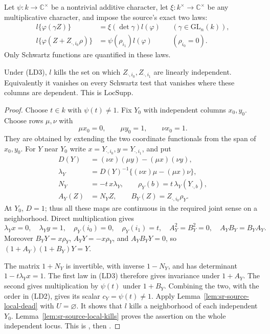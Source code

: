 Let \(\psi:k\to\mathbb C^\times\) be a nontrivial additive character,
let \(\xi:k^\times\to\mathbb C^\times\) be any multiplicative
character, and impose the source's exact two laws:
\[
 \begin{aligned}
 l\{\varphi(\gamma Z)\}&=\xi(\det\gamma)l(\varphi)
                      &&(\gamma\in\mathrm{GL}_n(k)),\\
 l\{\varphi(Z+Z_{\cdot,i_0}\rho)\}
       &=\psi(\rho_{i_1})l(\varphi)
                      &&(\rho_{i_0}=0).
 \end{aligned}\tag{LD3}\label{eq:sr-source-local-left-column}
\]
Only Schwartz functions are quantified in these laws.

\begin{srproposition}
\label{prop:sr-source-local-support}
Under (LD3), \(l\) kills the set on which
\(Z_{\cdot,i_0},Z_{\cdot,i_1}\) are linearly independent.
Equivalently it vanishes on every Schwartz test that vanishes
where these columns are dependent. This is \(\mathrm{LocSupp}\).
\end{srproposition}
\begin{proof}
Choose \(t\in k\) with \(\psi(t)\ne1\).
Fix \(Y_0\) with independent columns \(x_0,y_0\).
Choose rows \(\mu,\nu\) with
\[
 \mu x_0=0,\qquad \mu y_0=1,\qquad \nu x_0=1.
\]
They are obtained by extending the two coordinate functionals
from the span of \(x_0,y_0\).
For \(Y\) near \(Y_0\) write \(x=Y_{\cdot,i_0},y=Y_{\cdot,i_1}\), and put
\[
 \begin{split}
 D(Y)&=(\nu x)(\mu y)-(\mu x)(\nu y),\\
 \lambda_Y&=D(Y)^{-1}\{(\nu x)\mu-(\mu x)\nu\},\\
 N_Y&=-t\,x\lambda_Y,\qquad
 \rho_Y(b)=t\,\lambda_Y(Y_{\cdot,b}),\\
 A_Y(Z)&=N_YZ,\qquad B_Y(Z)=Z_{\cdot,i_0}\rho_Y .
 \end{split}\tag{LD4}\label{eq:sr-source-independent-stabilizers}
\]
At \(Y_0\), \(D=1\); thus all these maps are continuous in the
required joint sense on a neighborhood.
Direct multiplication gives
\[
 \lambda_Yx=0,\quad\lambda_Yy=1,\quad
 \rho_Y(i_0)=0,\quad\rho_Y(i_1)=t,\quad
 A_Y^2=B_Y^2=0,\quad A_YB_Y=B_YA_Y.
\]
Moreover \(B_YY=x\rho_Y\), \(A_YY=-x\rho_Y\), and
\(A_YB_YY=0\), so \((1+A_Y)(1+B_Y)Y=Y\).

The matrix \(1+N_Y\) is invertible, with inverse \(1-N_Y\),
and has determinant
\(1-t\lambda_Yx=1\).
The first law in (LD3) therefore gives invariance under \(1+A_Y\).
The second gives multiplication by \(\psi(t)\) under \(1+B_Y\).
Combining the two, with the order in (LD2), gives its scalar
\(c_Y=\psi(t)\ne1\).
Apply Lemma~\ref{lem:sr-source-local-dead} with \(U=\varnothing\).
It shows that \(l\) kills a neighborhood of each independent \(Y_0\).
Lemma~\ref{lem:sr-source-local-kills} proves the assertion on the
whole independent locus.
This is , then .
\end{proof}

